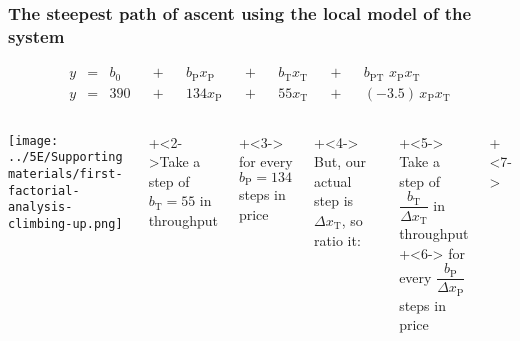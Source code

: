 \begin{frame}\frametitle{The steepest {\color{myOrange}path of ascent} using the local model of the system}

	\begin{exampleblock}{}
		\begin{align*} 
			y &=& b_0 &&+&& b_\text{P} x_\text{P} &&+&& b_\text{T} x_\text{T} &&+&& b_\text{PT}\,\,x_\text{P}x_\text{T} \\
			y &=& 390 &&+&& 134 x_\text{P}        &&+&& 55 x_\text{T}         &&+&& (-3.5)\,x_\text{P}x_\text{T} 
		\end{align*}		
	\end{exampleblock}
	
	\begin{columns}[c]
			\centerline{\texttt{[image: ../5E/Supporting materials/first-factorial-analysis-climbing-up.png]}}
		
			
			\vspace{.1cm}\onslide+<2->{\color{myGreen}Take a step of $b_\text{T}=55$ in throughput\\}
			
			\onslide+<3->{
				\color{myGreen}for every $b_\text{P}=134$ steps in price
			}
			
			\vspace{.3cm}
			\onslide+<4->{
				\color{myOrange}But, our actual step is $\Delta x_\text{T}$, so ratio it:
			}
			
			\vspace{.3cm}
			\onslide+<5->{
				\color{myGreen}Take a step of $\dfrac{b_\text{T}}{\Delta x_\text{T}}$ in throughput\\  
			}
			\onslide+<6->{
				\color{myGreen}for every $\dfrac{b_\text{P}}{\Delta x_\text{P}}$ steps in price
			}
			\vspace{0.3cm}
		
	   	 
			\onslide+<7->{
			}
		   	 
	\end{columns}
\end{frame}

